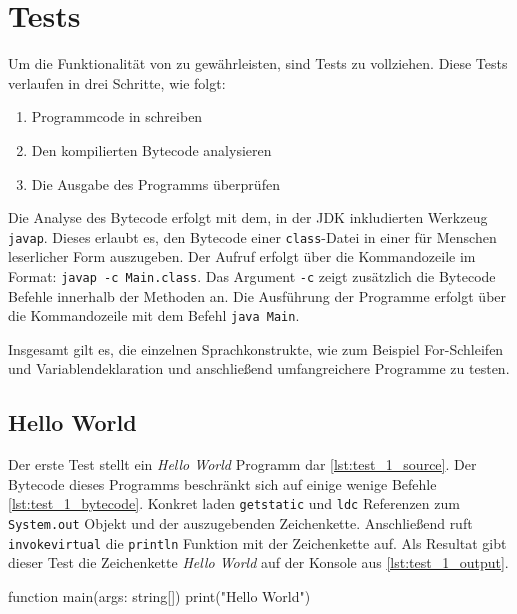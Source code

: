 \chapter{Tests}
\label{cha:tests}

Um die Funktionalität von \toya zu gewährleisten, sind Tests zu vollziehen. Diese Tests verlaufen in drei Schritte, wie folgt:
\begin{enumerate}
    \item Programmcode in \toya schreiben
    \item Den kompilierten Bytecode analysieren
    \item Die Ausgabe des Programms überprüfen
\end{enumerate}

Die Analyse des Bytecode erfolgt mit dem, in der JDK inkludierten Werkzeug \texttt{javap}. Dieses erlaubt es, den Bytecode einer \texttt{class}-Datei in einer für Menschen leserlicher Form auszugeben. Der Aufruf erfolgt über die Kommandozeile im Format: \texttt{javap -c Main.class}. Das Argument \texttt{-c} zeigt zusätzlich die Bytecode Befehle innerhalb der Methoden an. Die Ausführung der Programme erfolgt über die Kommandozeile mit dem Befehl \texttt{java Main}.

Insgesamt gilt es, die einzelnen Sprachkonstrukte, wie zum Beispiel For-Schleifen und Variablendeklaration und anschließend umfangreichere Programme zu testen.

\section{Hello World}

Der erste Test stellt ein \textit{Hello World} Programm dar \ref{lst:test_1_source}. Der Bytecode dieses Programms beschränkt sich auf einige wenige Befehle \ref{lst:test_1_bytecode}. Konkret laden \texttt{getstatic} und \texttt{ldc} Referenzen zum \texttt{System.out} Objekt und der auszugebenden Zeichenkette. Anschließend ruft \texttt{invokevirtual} die \texttt{println} Funktion mit der Zeichenkette auf. Als Resultat gibt dieser Test die Zeichenkette \textit{Hello World} auf der Konsole aus \ref{lst:test_1_output}.

\begin{ToyaCode}[numbers=none, caption={Quelltext des Hello World Programms},label=lst:test_1_source]
function main(args: string[]) {
    print("Hello World")
}
\end{ToyaCode}


